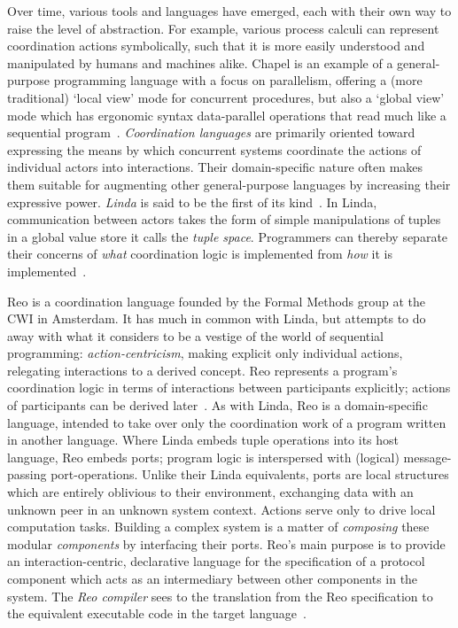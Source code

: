 Over time, various tools and languages have emerged, each with their own way to raise the level of abstraction. For example, various process calculi can represent coordination actions symbolically, such that it is more easily understood and manipulated by humans and machines alike. Chapel is an example of a general-purpose programming language with a focus on parallelism, offering a (more traditional) `local view' mode for concurrent procedures, but also a `global view' mode which has ergonomic syntax data-parallel operations that read much like a sequential program~\cite{chamberlain2007parallel}.
\textit{Coordination languages} are primarily oriented toward expressing the means by which concurrent systems coordinate the actions of individual actors into interactions. Their domain-specific nature often makes them suitable for augmenting other general-purpose languages by increasing their expressive power. \textit{Linda} is said to be the first of its kind~\cite{wells2005coordination}. In Linda, communication between actors takes the form of simple manipulations of tuples in a global value store it calls the \textit{tuple space}. Programmers can thereby separate their concerns of \textit{what} coordination logic is implemented from \textit{how} it is implemented~\cite{gelernter1992coordination}.

Reo is a coordination language founded by the Formal Methods group at the CWI in Amsterdam. It has much in common with Linda, but attempts to do away with what it considers to be a vestige of the world of sequential programming: \textit{action-centricism}, making explicit only individual actions, relegating interactions to a derived concept. Reo represents a program's coordination logic in terms of interactions between participants explicitly; actions of participants can be derived later~\cite{arbab2011puff}. As with Linda, Reo is a domain-specific language, intended to take over only the coordination work of a program written in another language. Where Linda embeds tuple operations into its host language, Reo embeds ports; program logic is interspersed with (logical) message-passing port-operations. Unlike their Linda equivalents, ports are local structures which are entirely oblivious to their environment, exchanging data with an unknown peer in an unknown system context. Actions serve only to drive local computation tasks. Building a complex system is a matter of \textit{composing} these modular \textit{components} by interfacing their ports. Reo's main purpose is to provide an interaction-centric, declarative language for the specification of a protocol component which acts as an intermediary between other components in the system. The \textit{Reo compiler} sees to the translation from the Reo specification to the equivalent executable code in the target language~\cite{arbab2011puff}.

